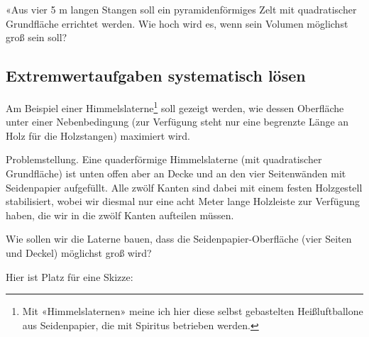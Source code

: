 
«Aus vier 5 m langen Stangen soll ein pyramidenförmiges Zelt mit quadratischer Grundfläche errichtet werden.
Wie hoch wird es, wenn sein Volumen möglichst groß sein soll?

\newpage


\subsection{Extremwertaufgaben systematisch lösen}
Am Beispiel einer Himmelslaterne\footnote{Mit «Himmelslaternen» meine ich hier diese selbst gebastelten Heißluftballone aus Seidenpapier, die mit Spiritus betrieben werden.} soll gezeigt werden, wie dessen Oberfläche unter einer Nebenbedingung (zur Verfügung steht nur eine begrenzte Länge an Holz für die Holzstangen) maximiert wird.

Problemstellung. Eine quaderförmige Himmelslaterne (mit quadratischer
Grundfläche) ist unten offen aber an Decke und an den vier Seitenwänden mit Seidenpapier aufgefüllt. Alle zwölf Kanten sind dabei mit einem festen Holzgestell stabilisiert, wobei wir diesmal nur eine acht Meter lange Holzleiste zur Verfügung haben, die wir in die zwölf Kanten aufteilen müssen.

Wie sollen wir die Laterne bauen, dass die Seidenpapier-Oberfläche (vier Seiten und Deckel) möglichst groß wird?

Hier ist Platz für eine Skizze:


\newpage


